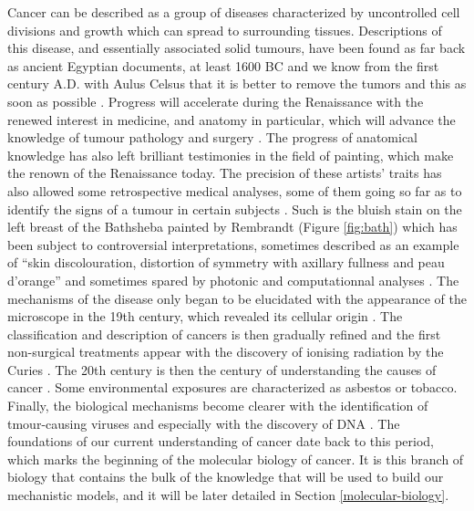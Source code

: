 \documentclass[a4paper,12pt,twoside,onecolumn,openright,final,oldfontcommands]{memoir}
\begin{document}
Cancer can be described as a group of diseases characterized by
uncontrolled cell divisions and growth which can spread to surrounding
tissues. Descriptions of this disease, and essentially associated solid
tumours, have been found as far back as ancient Egyptian documents, at
least 1600 BC and we know from the first century A.D. with Aulus Celsus
that it is better to remove the tumors and this as soon as possible
\citep{hajdu2011note}. Progress will accelerate during the Renaissance
with the renewed interest in medicine, and anatomy in particular, which
will advance the knowledge of tumour pathology and surgery
\citep{hajdu2011note2}. The progress of anatomical knowledge has also
left brilliant testimonies in the field of painting, which make the
renown of the Renaissance today. The precision of these artists' traits
has also allowed some retrospective medical analyses, some of them going
so far as to identify the signs of a tumour in certain subjects
\citep{bianucci2018earliest}. Such is the bluish stain on the left
breast of the Bathsheba painted by Rembrandt (Figure \ref{fig:bath})
which has been subject to controversial interpretations, sometimes
described as an example of ``skin discolouration, distortion of symmetry
with axillary fullness and peau d'orange''
\citep{braithwaite1983rembrandt} and sometimes spared by photonic and
computationnal analyses \citep{heijblom2014monte}. The mechanisms of the
disease only began to be elucidated with the appearance of the
microscope in the 19th century, which revealed its cellular origin
\citep{hajdu2012note}. The classification and description of cancers is
then gradually refined and the first non-surgical treatments appear with
the discovery of ionising radiation by the Curies
\citep{hajdu2012note2}. The 20th century is then the century of
understanding the causes of cancer
\citep{hajdu2013note, hajdu2013note2}. Some environmental exposures are
characterized as asbestos or tobacco. Finally, the biological mechanisms
become clearer with the identification of tmour-causing viruses and
especially with the discovery of DNA \citep{watson1953molecular}. The
foundations of our current understanding of cancer date back to this
period, which marks the beginning of the molecular biology of cancer. It
is this branch of biology that contains the bulk of the knowledge that
will be used to build our mechanistic models, and it will be later
detailed in Section \ref{molecular-biology}.
\end{document}
